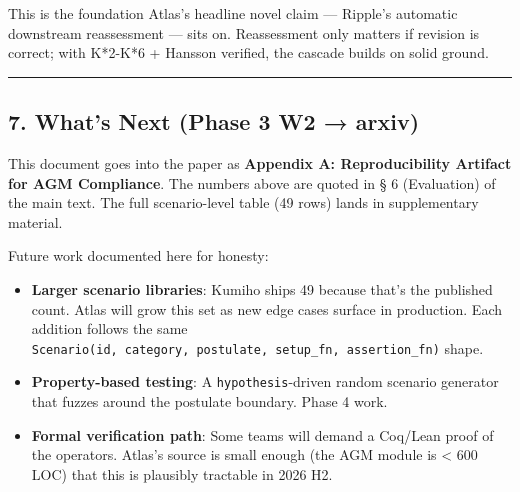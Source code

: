 \documentclass[
]{article}
\providecommand{\tightlist}{%
  \setlength{\itemsep}{0pt}\setlength{\parskip}{0pt}}
\begin{document}
This is the foundation Atlas's headline novel claim --- Ripple's
automatic downstream reassessment --- sits on. Reassessment only matters
if revision is correct; with K*2-K*6 + Hansson verified, the cascade
builds on solid ground.

\begin{center}\rule{0.5\linewidth}{0.5pt}\end{center}

\subsection{7. What's Next (Phase 3 W2 →
arxiv)}\label{whats-next-phase-3-w2-arxiv}

This document goes into the paper as \textbf{Appendix A: Reproducibility
Artifact for AGM Compliance}. The numbers above are quoted in § 6
(Evaluation) of the main text. The full scenario-level table (49 rows)
lands in supplementary material.

Future work documented here for honesty:

\begin{itemize}
\tightlist
\item
  \textbf{Larger scenario libraries}: Kumiho ships 49 because that's the
  published count. Atlas will grow this set as new edge cases surface in
  production. Each addition follows the same
  \texttt{Scenario(id,\ category,\ postulate,\ setup\_fn,\ assertion\_fn)}
  shape.
\item
  \textbf{Property-based testing}: A \texttt{hypothesis}-driven random
  scenario generator that fuzzes around the postulate boundary. Phase 4
  work.
\item
  \textbf{Formal verification path}: Some teams will demand a Coq/Lean
  proof of the operators. Atlas's source is small enough (the AGM module
  is \textless{} 600 LOC) that this is plausibly tractable in 2026 H2.
\end{itemize}
\end{document}
